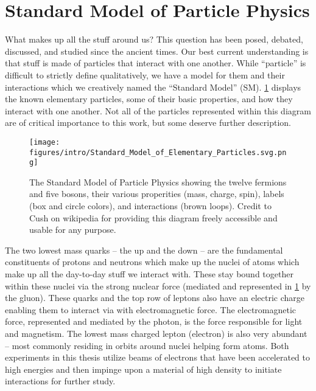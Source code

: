 \section{Standard Model of Particle Physics}
\label{sec:sm}

What makes up all the stuff around us? This question has been posed, debated, discussed, and
studied since the ancient times. Our best current understanding is that stuff is made of particles
that interact with one another. While ``particle'' is difficult to strictly define qualitatively,
we have a model for them and their interactions which we creatively named the ``Standard Model''
(SM). \cref{fig:sm} displays the known elementary particles, some of their basic properties, and
how they interact with one another. Not all of the particles represented within this diagram are of
critical importance to this work, but some deserve further description.

\begin{figure}
  \centering
  \texttt{[image: figures/intro/Standard\_Model\_of\_Elementary\_Particles.svg.png]}
  \caption{
    The Standard Model of Particle Physics showing the twelve fermions and five bosons,
    their various properities (mass, charge, spin), labels (box and circle colors),
    and interactions (brown loops). Credit to Cush on wikipedia for
    providing this diagram freely accessible and usable for any purpose.
  }
  \label{fig:sm}
\end{figure}

The two lowest mass quarks -- the up and the down -- are the fundamental constituents of protons
and neutrons which make up the nuclei of atoms which make up all the day-to-day stuff we interact
with. These stay bound together within these nuclei via the strong nuclear force (mediated and
represented in \cref{fig:sm} by the gluon). These quarks and the top row of leptons also have an
electric charge enabling them to interact via with electromagnetic force. The electromagnetic
force, represented and mediated by the photon, is the force responsible for light and magnetism.
The lowest mass charged lepton (electron) is also very abundant -- most commonly residing in orbits
around nuclei helping form atoms. Both experiments in this thesis utilize beams of electrons that
have been accelerated to high energies and then impinge upon a material of high density to initiate
interactions for further study.

